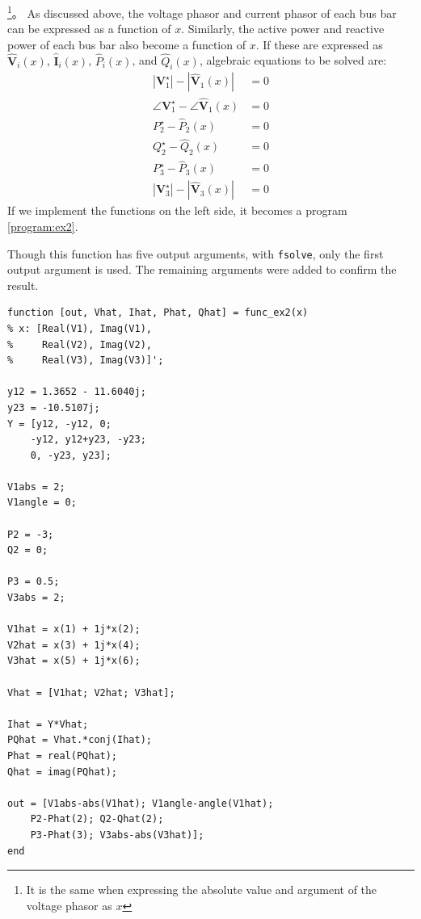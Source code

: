 \documentclass[graybox, envcountchap]{svmult}
\begin{document}
\begin{example}
\footnote{It is the same when expressing the absolute value and argument of the voltage phasor as $x$}。
As discussed above, the voltage phasor and current phasor of each bus bar can be expressed as a function of $x$.
Similarly, the active power and reactive power of each bus bar also become a function of $x$.
If these are expressed as $\hat{\bm V}_i(x)$, $\hat{\bm I}_i(x)$, $\hat{P}_i(x)$, and $\hat{Q}_i(x)$, algebraic equations to be solved are:
\begin{align*}
    |\bm V_1^{\star}|-|\hat{\bm V}_1(x)| &= 0\\
    \angle \bm V_1^{\star} - \angle \hat{\bm V}_1(x) &= 0\\
    P_2^{\star} -\hat P_2(x) &= 0\\
    Q_2^{\star} -\hat Q_2(x) &= 0\\
    P_3^{\star} -\hat P_3(x) &= 0\\
    |\bm V_3^{\star}|-|\hat{\bm V}_3(x)| &= 0
 \end{align*}
 If we implement the functions on the left side, it becomes a program \nobreak\ref{program:ex2}.

 Though this function has five output arguments, with \texttt{fsolve}, only the first output argument is used.
 The remaining arguments were added to confirm the result.


\smallskip
\begin{PROGRAMA}[count, title={func\_ex2.m}]\label{program:ex2}
\begin{verbatim}
function [out, Vhat, Ihat, Phat, Qhat] = func_ex2(x)
% x: [Real(V1), Imag(V1),
%     Real(V2), Imag(V2),
%     Real(V3), Imag(V3)]';

y12 = 1.3652 - 11.6040j;
y23 = -10.5107j;
Y = [y12, -y12, 0;
    -y12, y12+y23, -y23;
    0, -y23, y23];

V1abs = 2;
V1angle = 0;

P2 = -3;
Q2 = 0;

P3 = 0.5;
V3abs = 2;

V1hat = x(1) + 1j*x(2);
V2hat = x(3) + 1j*x(4);
V3hat = x(5) + 1j*x(6);

Vhat = [V1hat; V2hat; V3hat];

Ihat = Y*Vhat;
PQhat = Vhat.*conj(Ihat);
Phat = real(PQhat);
Qhat = imag(PQhat);

out = [V1abs-abs(V1hat); V1angle-angle(V1hat);
    P2-Phat(2); Q2-Qhat(2);
    P3-Phat(3); V3abs-abs(V3hat)];
end
\end{verbatim}
\end{PROGRAMA}


\end{example}
\end{document}
